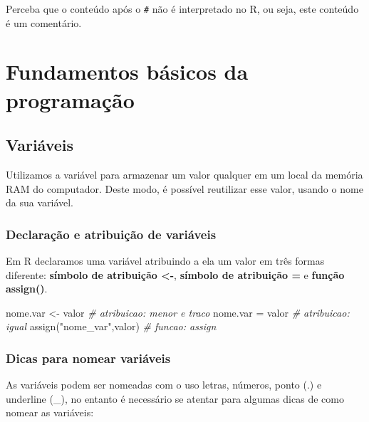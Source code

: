 \documentclass[
]{book}
\newenvironment{Shaded}{\begin{snugshade}}{\end{snugshade}}
\newcommand{\CommentTok}[1]{\textcolor[rgb]{0.56,0.35,0.01}{\textit{#1}}}
\newcommand{\FunctionTok}[1]{\textcolor[rgb]{0.00,0.00,0.00}{#1}}
\newcommand{\NormalTok}[1]{#1}
\newcommand{\OtherTok}[1]{\textcolor[rgb]{0.56,0.35,0.01}{#1}}
\newcommand{\StringTok}[1]{\textcolor[rgb]{0.31,0.60,0.02}{#1}}
\theoremstyle{definition}
\theoremstyle{definition}
\theoremstyle{definition}
\theoremstyle{definition}
\theoremstyle{remark}
\begin{document}
Perceba que o conteúdo após o \texttt{\#} não é interpretado no R, ou seja, este conteúdo é um comentário.

\hypertarget{fundamentos-buxe1sicos-da-programauxe7uxe3o}{%
\chapter{Fundamentos básicos da programação}\label{fundamentos-buxe1sicos-da-programauxe7uxe3o}}

\hypertarget{variuxe1veis}{%
\section{Variáveis}\label{variuxe1veis}}

Utilizamos a variável para armazenar um valor qualquer em um local da memória RAM do computador. Deste modo, é possível reutilizar esse valor, usando o nome da sua variável.

\hypertarget{declarauxe7uxe3o-e-atribuiuxe7uxe3o-de-variuxe1veis}{%
\subsection{Declaração e atribuição de variáveis}\label{declarauxe7uxe3o-e-atribuiuxe7uxe3o-de-variuxe1veis}}

Em R declaramos uma variável atribuindo a ela um valor em três formas diferente: \textbf{símbolo de atribuição \textless-}, \textbf{símbolo de atribuição =} e \textbf{função assign()}.

\begin{Shaded}
\begin{Highlighting}[]
\NormalTok{nome.var }\OtherTok{\textless{}{-}}\NormalTok{ valor }\CommentTok{\# atribuicao: menor e traco}
\NormalTok{nome.var }\OtherTok{=}\NormalTok{ valor }\CommentTok{\# atribuicao: igual}
\FunctionTok{assign}\NormalTok{(}\StringTok{"nome\_var"}\NormalTok{,valor) }\CommentTok{\# funcao: assign}
\end{Highlighting}
\end{Shaded}

\hypertarget{dicas-para-nomear-variuxe1veis}{%
\subsection{Dicas para nomear variáveis}\label{dicas-para-nomear-variuxe1veis}}

As variáveis podem ser nomeadas com o uso letras, números, ponto (.) e underline (\_), no entanto é necessário se atentar para algumas dicas de como nomear as variáveis:
\end{document}
